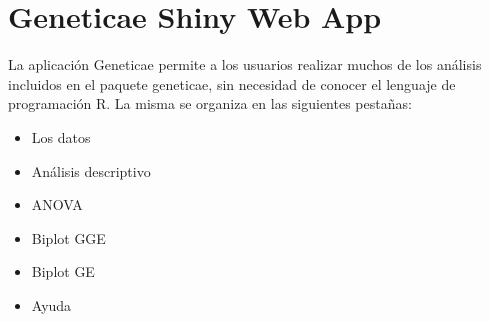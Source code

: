 \section{Geneticae Shiny Web App}

La aplicación Geneticae permite a los usuarios realizar muchos de los análisis incluidos en el paquete geneticae, sin necesidad de conocer el lenguaje de programación R. La misma se organiza en las siguientes pestañas:
\begin{itemize}
\item Los datos
\item Análisis descriptivo
\item ANOVA
\item Biplot GGE
\item Biplot GE
\item Ayuda
\end{itemize}


